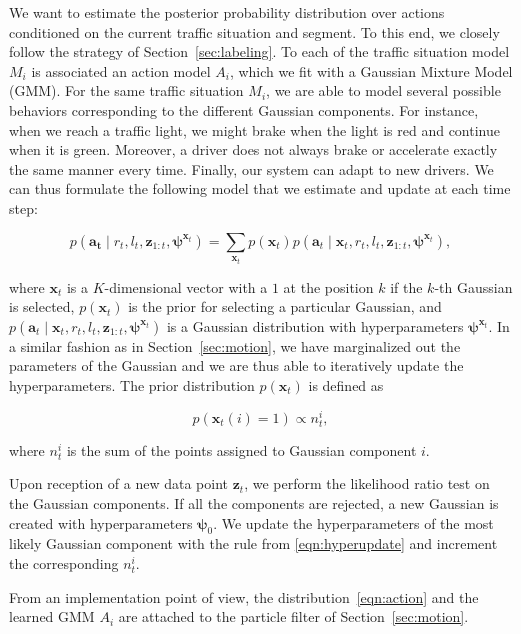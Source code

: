 We want to estimate the posterior probability distribution over actions
conditioned on the current traffic situation and segment. To this end, we
closely follow the strategy of Section~\ref{sec:labeling}. To each of the
traffic situation model $M_i$ is associated an action model $A_i$, which we fit
with a Gaussian Mixture Model (GMM). For the same traffic situation $M_i$, we
are able to model several possible behaviors corresponding to the different
Gaussian components. For instance, when we reach a traffic light, we might brake
when the light is red and continue when it is green. Moreover, a driver does not
always brake or accelerate exactly the same manner every time. Finally, our
system can adapt to new drivers. We can thus formulate the following model that
we estimate and update at each time step:

\begin{equation}
\label{eqn:action}
p(\mathbf{a_t} \mid r_t, l_t,\mathbf{z}_{1:t},\boldsymbol{\psi}^{\mathbf{x}_t})=
\sum_{\mathbf{x}_t} p(\mathbf{x}_t)p(\mathbf{a}_t\mid\mathbf{x}_t,r_t,l_t,
\mathbf{z}_{1:t},\boldsymbol{\psi}^{\mathbf{x}_t}),
\end{equation}

where $\mathbf{x}_t$ is a $K$-dimensional vector with a $1$ at the position $k$
if the $k$-th Gaussian is selected, $p(\mathbf{x}_t)$ is the prior for selecting
a particular Gaussian, and $p(\mathbf{a}_t\mid\mathbf{x}_t,r_t,l_t,
\mathbf{z}_{1:t},\boldsymbol{\psi}^{\mathbf{x}_t})$ is a Gaussian distribution
with hyperparameters $\boldsymbol{\psi}^{\mathbf{x}_t}$. In a similar fashion as
in Section~\ref{sec:motion}, we have marginalized out the parameters of the
Gaussian and we are thus able to iteratively update the hyperparameters. The
prior distribution $p(\mathbf{x}_t)$ is defined as

\begin{equation}
\label{eqn:gaussianprior}
p(\mathbf{x}_t(i)=1)\propto n_t^i,
\end{equation}

where $n_t^i$ is the sum of the points assigned to Gaussian component $i$.

Upon reception of a new data point $\mathbf{z}_t$, we perform the likelihood
ratio test on the Gaussian components. If all the components are rejected, a new
Gaussian is created with hyperparameters $\boldsymbol{\psi}_0$. We update the
hyperparameters of the most likely Gaussian component with the rule from
\eqref{eqn:hyperupdate} and increment the corresponding $n_t^i$.

From an implementation point of view, the distribution~\eqref{eqn:action} and
the learned GMM $A_i$ are attached to the particle filter of
Section~\ref{sec:motion}.

